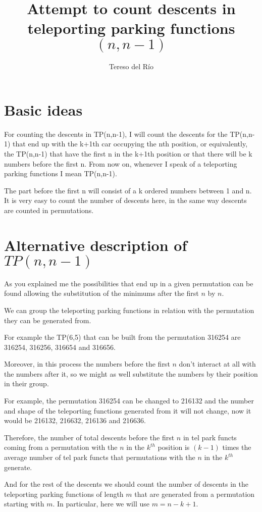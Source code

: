 \documentclass{article}
\begin{document}
\title{Attempt to count descents in teleporting parking functions $(n,n-1)$}
\author{Tereso del Río}
\section{Basic ideas}

For counting the descents in TP(n,n-1), I will count the descents for the TP(n,n-1) that end up with the k+1th car occupying the nth position, or equivalently, the TP(n,n-1) that have the first n in the k+1th position or that there will be k numbers before the first n. From now on, whenever I speak of a teleporting parking functions I mean TP(n,n-1).

The part before the first n will consist of a k ordered numbers between 1 and n. It is very easy to count the number of descents here, in the same way descents are counted in permutations. 


\section{Alternative description of $TP(n,n-1)$}

As you explained me the possibilities that end up in a given permutation can be found allowing the substitution of the minimums after the first $n$ by $n$.

We can group the teleporting parking functions in relation with the permutation they can be generated from.

For example the TP(6,5) that can be built from the permutation 316254 are 316254, 316256, 316654 and 316656.

Moreover, in this process the numbers before the first $n$ don't interact at all with the numbers after it, so we might as well substitute the numbers by their position in their group.

For example, the permutation 316254 can be changed to 216132 and the number and shape of the teleporting functions generated from it will not change, now it would be 216132, 216632, 216136 and 216636.

Therefore, the number of total descents before the first $n$ in tel park functs coming from a permutation with the $n$ in the $k^{th}$ position is $(k-1)$ times the average number of tel park functs that permutations with the $n$ in the $k^{th}$ generate.

And for the rest of the descents we should count the number of descents in the teleporting parking functions of length $m$ that are generated from a permutation starting with $m$. In particular, here we will use $m=n-k+1$.
\end{document}
